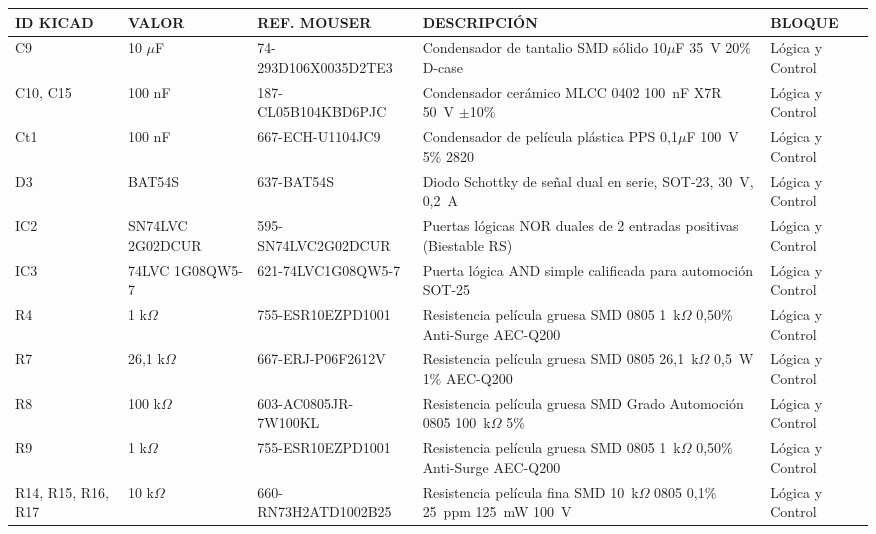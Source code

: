 \documentclass[12pt]{report} %
\begin{document}
\newpage %
\begin{table}[H]
    \centering
    \fontsize{10}{12}\selectfont
    \captionsetup{width=\textwidth}
    {\begin{tabular}{|P{1.5cm}|P{1.7cm}|P{3.2cm}|P{5.3cm}|P{2.7cm}|}
        \hline
        \textbf{ID KICAD} & \textbf{VALOR} & \textbf{REF. MOUSER} & \textbf{DESCRIPCIÓN} & \textbf{BLOQUE} \\
        \hline
        C9 & 10 $\mu$F & 74-293D106X0035D2TE3 & Condensador de tantalio SMD sólido 10$\mu$F 35~V 20\% D-case & Lógica y Control \\ \hline
        C10, C15 & 100 nF & 187-CL05B104KBD6PJC & Condensador cerámico MLCC 0402 100~nF X7R 50~V $\pm$10\% & Lógica y Control \\ \hline
        Ct1 & 100 nF & 667-ECH-U1104JC9 & Condensador de película plástica PPS 0,1$\mu$F 100~V 5\% 2820 & Lógica y Control \\ \hline
        D3 & BAT54S & 637-BAT54S & Diodo Schottky de señal dual en serie, SOT-23, 30~V, 0,2~A & Lógica y Control \\ \hline
        IC2 & SN74LVC 2G02DCUR & 595-SN74LVC2G02DCUR & Puertas lógicas NOR duales de 2 entradas positivas (Biestable RS) & Lógica y Control \\ \hline
        IC3 & 74LVC 1G08QW5-7 & 621-74LVC1G08QW5-7 & Puerta lógica AND simple calificada para automoción SOT-25 & Lógica y Control \\ \hline
        R4 & 1 k$\Omega$ & 755-ESR10EZPD1001 & Resistencia película gruesa SMD 0805 1~k$\Omega$ 0,50\% Anti-Surge AEC-Q200 & Lógica y Control \\ \hline
        R7 & 26{,}1 k$\Omega$ & 667-ERJ-P06F2612V & Resistencia película gruesa SMD 0805 26,1~k$\Omega$ 0,5~W 1\% AEC-Q200 & Lógica y Control \\ \hline
        R8 & 100 k$\Omega$ & 603-AC0805JR-7W100KL & Resistencia película gruesa SMD Grado Automoción 0805 100~k$\Omega$ 5\% & Lógica y Control \\ \hline
        R9 & 1 k$\Omega$ & 755-ESR10EZPD1001 & Resistencia película gruesa SMD 0805 1~k$\Omega$ 0,50\% Anti-Surge AEC-Q200 & Lógica y Control \\ \hline
        R14, R15, R16, R17 & 10 k$\Omega$ & 660-RN73H2ATD1002B25 & Resistencia película fina SMD 10~k$\Omega$ 0805 0,1\% 25~ppm 125~mW 100~V & Lógica y Control \\ \hline

\end{tabular}}
\end{table}
\end{document}
